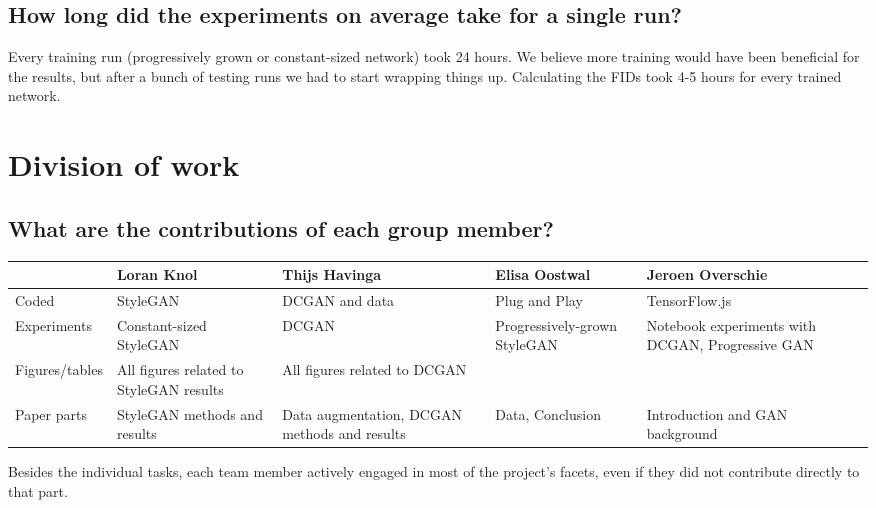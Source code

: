 \documentclass{article}
\begin{document}
\subsection{How long did the experiments on average take for a single run?}
Every training run (progressively grown or constant-sized network) took 24 hours. We believe more training would have been beneficial for the results, but after a bunch of testing runs we had to start wrapping things up. Calculating the FIDs took 4-5 hours for every trained network.

\section{Division of work}

\subsection{What are the contributions of each group member?}
\begin{table}[h!]
    \centering
    \begin{tabularx}{\linewidth}{l|X|X|X|X}
                        & Loran Knol                                & Thijs Havinga                     & Elisa Oostwal                 & Jeroen Overschie  \\
        \hline
        Coded           & StyleGAN                                  & DCGAN and data                    & Plug and Play                 & TensorFlow.js     \\
        \hline
        Experiments     & Constant-sized StyleGAN                   & DCGAN                             & Progressively-grown StyleGAN  &  Notebook experiments with DCGAN, Progressive GAN   \\
        \hline
        Figures/tables  & All figures related to StyleGAN results   & All figures related to DCGAN                                  &                               &                   \\
        \hline
        Paper parts     & StyleGAN methods and results              & Data augmentation, DCGAN methods and results   & Data, Conclusion                    & Introduction and GAN background             
    \end{tabularx}
    \label{tab:my_label}
\end{table}

Besides the individual tasks, each team member actively engaged in most of the project's facets, even if they did not contribute directly to that part.
\end{document}
